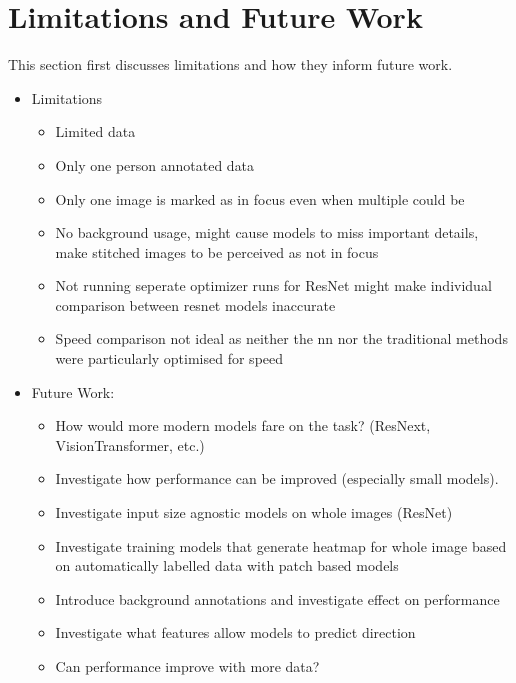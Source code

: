 \section{Limitations and Future Work}
\label{sec:Conclusion:FutureWork}

This section first discusses limitations and how they inform future work.

\begin{itemize}
    \item Limitations
    \begin{itemize}
        \item Limited data
        \item Only one person annotated data
        \item Only one image is marked as in focus even when multiple could be
        \item No background usage, might cause models to miss important details, make stitched images to be perceived as not in focus
        \item Not running seperate optimizer runs for ResNet might make individual comparison between resnet models inaccurate
        \item Speed comparison not ideal as neither the nn nor the traditional methods were particularly optimised for speed
    \end{itemize}
\end{itemize}

\begin{itemize}
    \item Future Work:
    \begin{itemize}
        \item How would more modern models fare on the task? (ResNext, VisionTransformer, etc.)
        \item Investigate how performance can be improved (especially small models).
        \item Investigate input size agnostic models on whole images (ResNet)
        \item Investigate training models that generate heatmap for whole image based on automatically labelled data with patch based models
        \item Introduce background annotations and investigate effect on performance
        \item Investigate what features allow models to predict direction
        \item Can performance improve with more data?
    \end{itemize}
\end{itemize}
